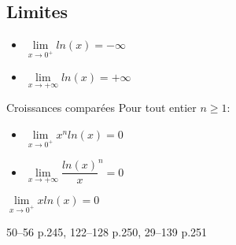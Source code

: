 \documentclass[a4paper]{article}
\begin{document}
\pagebreak
\subsection{Limites}
\begin{propriete}{}{}

  \begin{itemize}[label=\textbullet]
    \item  $\lim\limits_{x \to 0^+} ln(x)=-\infty$
    \item $\lim\limits_{x \to +\infty} ln(x)=+\infty$
  \end{itemize}
\end{propriete}
\begin{propriete}{Croissances comparées}{}
  Pour tout entier $n\geqslant 1$:
  \begin{itemize}[label=\textbullet]
    \item  $\lim\limits_{x \to 0^+} x^n ln(x)=0$
    \item $\lim\limits_{x \to +\infty} \dfrac{ln(x)}x^n{}=0$
  \end{itemize}
\end{propriete}

\begin{demonstrationp}{ $\lim\limits_{x \to 0^+} x ln(x)=0$}{}
  \vspace{10cm}
  
\end{demonstrationp}

\begin{exercices}{}{}
50--56 p.245, 122--128 p.250, 29--139 p.251
\end{exercices}





  
\end{document}
